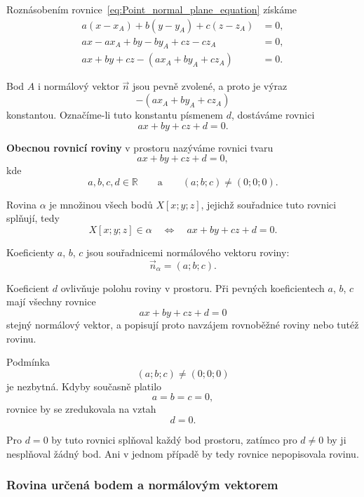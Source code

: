 Roznásobením rovnice~\eqref{eq:Point_normal_plane_equation} získáme
\begin{align*}
    a(x-x_A)+b(y-y_A)+c(z-z_A)&=0,\\
    ax-ax_A+by-by_A+cz-cz_A&=0,\\
    ax+by+cz-(ax_A+by_A+cz_A)&=0.
\end{align*}

Bod $A$ i normálový vektor $\vec{n}$ jsou pevně zvolené, a proto je
výraz
\[
    -(ax_A+by_A+cz_A)
\]
konstantou. Označíme-li tuto konstantu písmenem $d$, dostáváme rovnici
\[
    ax+by+cz+d=0.
\]

\begin{definition}
    \label{def:General_plane_equation}

    \textbf{Obecnou rovnicí roviny} v prostoru nazýváme rovnici tvaru
    \begin{equation}
        ax+by+cz+d=0,
        \label{eq:General_plane_equation}
    \end{equation}
    kde
    \[
        a,b,c,d\in\mathbb{R}
        \qquad\text{a}\qquad
        (a;b;c)\neq(0;0;0).
    \]

    Rovina $\alpha$ je množinou všech bodů $X[x;y;z]$, jejichž souřadnice
    tuto rovnici splňují, tedy
    \[
        X[x;y;z]\in\alpha
        \quad\Longleftrightarrow\quad
        ax+by+cz+d=0.
    \]
\end{definition}

Koeficienty $a$, $b$, $c$ jsou souřadnicemi normálového vektoru roviny:
\begin{equation}
    \vec{n}_{\alpha}=(a;b;c).
    \label{eq:Normal_vector_from_general_plane}
\end{equation}

Koeficient $d$ ovlivňuje polohu roviny v prostoru. Při pevných
koeficientech $a$, $b$, $c$ mají všechny rovnice
\[
    ax+by+cz+d=0
\]
stejný normálový vektor, a popisují proto navzájem rovnoběžné roviny
nebo tutéž rovinu.

Podmínka
\[
    (a;b;c)\neq(0;0;0)
\]
je nezbytná. Kdyby současně platilo
\[
    a=b=c=0,
\]
rovnice by se zredukovala na vztah
\[
    d=0.
\]

Pro $d=0$ by tuto rovnici splňoval každý bod prostoru, zatímco pro
$d\neq0$ by ji nesplňoval žádný bod. Ani v jednom případě by tedy
rovnice nepopisovala rovinu.


\subsubsection{Rovina určená bodem a normálovým vektorem}
\label{subsubsec:Plane_point_normal_vector}


